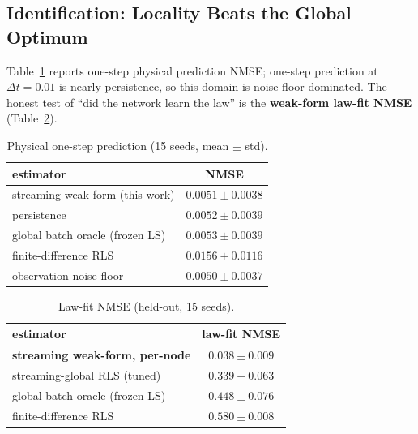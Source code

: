 \documentclass[conference]{IEEEtran}
\begin{document}
\subsection{Identification: Locality Beats the Global Optimum}
Table~\ref{tab:phys} reports one-step physical prediction NMSE; one-step prediction at
$\Delta t = 0.01$ is nearly persistence, so this domain is noise-floor-dominated. The
honest test of ``did the network learn the law'' is the \textbf{weak-form law-fit
NMSE} (Table~\ref{tab:law}).

\begin{table}[t]
\centering\footnotesize
\caption{Physical one-step prediction (15 seeds, mean $\pm$ std).}
\label{tab:phys}
\begin{tabular}{lc}
\toprule
estimator & NMSE \\
\midrule
streaming weak-form (this work) & $0.0051 \pm 0.0038$ \\
persistence & $0.0052 \pm 0.0039$ \\
global batch oracle (frozen LS) & $0.0053 \pm 0.0039$ \\
finite-difference RLS & $0.0156 \pm 0.0116$ \\
observation-noise floor & $0.0050 \pm 0.0037$ \\
\bottomrule
\end{tabular}
\end{table}

\begin{table}[t]
\centering\footnotesize
\caption{Law-fit NMSE (held-out, 15 seeds).}
\label{tab:law}
\begin{tabular}{lc}
\toprule
estimator & law-fit NMSE \\
\midrule
\textbf{streaming weak-form, per-node} & $\mathbf{0.038 \pm 0.009}$ \\
streaming-global RLS (tuned) & $0.339 \pm 0.063$ \\
global batch oracle (frozen LS) & $0.448 \pm 0.076$ \\
finite-difference RLS & $0.580 \pm 0.008$ \\
\bottomrule
\end{tabular}
\end{table}
\end{document}
